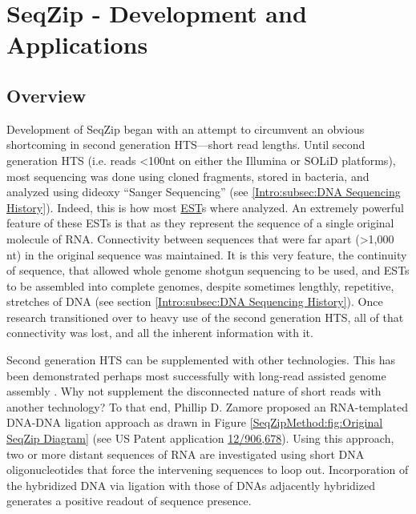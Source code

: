 \chapter{SeqZip - Development and Applications} 
\label{SeqZipMethod} 
\section{Overview}
  \label{SeqZipMethod:sec:SeqZip Overview}

  Development of SeqZip began with an attempt to circumvent an obvious shortcoming in second generation HTS---short read lengths. Until second generation HTS (i.e. reads <100nt on either the Illumina or SOLiD platforms), most sequencing was done using cloned fragments, stored in bacteria, and analyzed using dideoxy ``Sanger Sequencing'' (see \ref{Intro:subsec:DNA Sequencing History}). Indeed, this is how most \hyperref[hd:abrevs]{EST}s where analyzed. An extremely powerful feature of these ESTs is that as they represent the sequence of a single original molecule of RNA. Connectivity between sequences that were far apart (>1,000 nt) in the original sequence was maintained. It is this very feature, the continuity of sequence, that allowed whole genome shotgun sequencing to be used, and ESTs to be assembled into complete genomes, despite sometimes lengthly, repetitive, stretches of DNA (see section \ref{Intro:subsec:DNA Sequencing History}). Once research transitioned over to heavy use of the second generation HTS, all of that connectivity was lost, and all the inherent information with it.

  Second generation HTS can be supplemented with other technologies. This has been demonstrated perhaps most successfully with long-read assisted genome assembly \citep{Koren2012a}. Why not supplement the disconnected nature of short reads with another technology? To that end, Phillip D. Zamore proposed an RNA-templated DNA-DNA ligation approach as drawn in Figure \ref{SeqZipMethod:fig:Original SeqZip Diagram} (see US Patent application \href{http://1.usa.gov/PTG9BB}{12/906,678}). Using this approach, two or more distant sequences of RNA are investigated using short DNA oligonucleotides that force the intervening sequences to loop out. Incorporation of the hybridized DNA via ligation with those of DNAs adjacently hybridized generates a positive readout of sequence presence.

